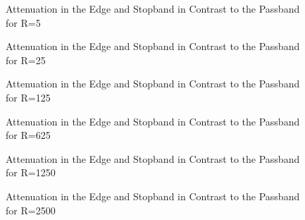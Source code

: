 \begin{figure}
    \centering
    
    \caption[Attenuation in the Edge and Stopband in Contrast to the Passband for R=5]{%
    Attenuation in the Edge and Stopband in Contrast to the Passband for R=5%
    }
    \label{fig:verification:fB5}
\end{figure}

\begin{figure}
    \centering
    
    \caption[Attenuation in the Edge and Stopband in Contrast to the Passband for R=25]{%
    Attenuation in the Edge and Stopband in Contrast to the Passband for R=25%
    }
    \label{fig:verification:fB25}
\end{figure}

\begin{figure}
    \centering
    
    \caption[Attenuation in the Edge and Stopband in Contrast to the Passband for R=125]{%
    Attenuation in the Edge and Stopband in Contrast to the Passband for R=125%
    }
    \label{fig:verification:fB125}
\end{figure}

\begin{figure}
    \centering
    
    \caption[Attenuation in the Edge and Stopband in Contrast to the Passband for R=625]{%
    Attenuation in the Edge and Stopband in Contrast to the Passband for R=625%
    }
    \label{fig:verification:fB625}
\end{figure}

\begin{figure}
    \centering
    
    \caption[Attenuation in the Edge and Stopband in Contrast to the Passband for R=1250]{%
    Attenuation in the Edge and Stopband in Contrast to the Passband for R=1250%
    }
    \label{fig:verification:fB5}
\end{figure}

\begin{figure}
    \centering
    
    \caption[Attenuation in the Edge and Stopband in Contrast to the Passband for R=2500]{%
    Attenuation in the Edge and Stopband in Contrast to the Passband for R=2500%
    }
    \label{fig:verification:fB5}
\end{figure}

%
%
